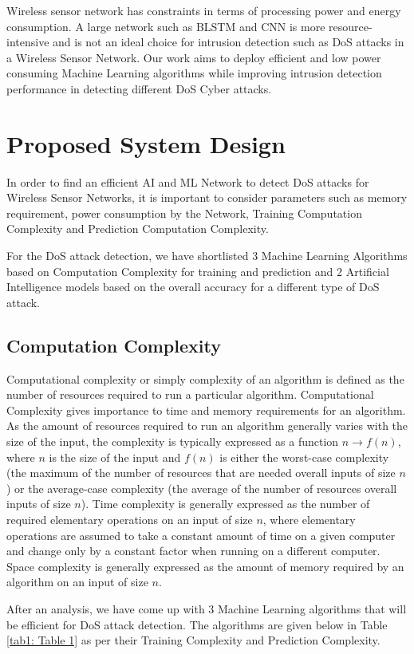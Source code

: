 \documentclass[conference]{IEEEtran}
\begin{document}
Wireless sensor network has constraints in terms of processing power and energy consumption. A large network such as BLSTM and CNN is more resource-intensive and is not an ideal choice for intrusion detection such as DoS attacks in a Wireless Sensor Network. Our work aims to deploy efficient and low power consuming Machine Learning algorithms while improving intrusion detection performance in detecting different DoS Cyber attacks.

\section{Proposed System Design}
In order to find an efficient AI and ML Network to detect DoS attacks for Wireless Sensor Networks, it is important to consider parameters such as memory requirement, power consumption by the Network, Training Computation Complexity and Prediction Computation Complexity. 

For the DoS attack detection, we have shortlisted 3 Machine Learning Algorithms based on Computation Complexity for training and prediction and 2 Artificial Intelligence models based on the overall accuracy for a different type of DoS attack. 

\subsection{Computation Complexity}
Computational complexity or simply complexity of an algorithm is defined as the number of resources required to run a particular algorithm. Computational Complexity gives importance to time and memory requirements for an algorithm. As the amount of resources required to run an algorithm generally varies with the size of the input, the complexity is typically expressed as a function $n \rightarrow{} f(n)$, where $n$ is the size of the input and $f(n)$ is either the worst-case complexity (the maximum of the number of resources that are needed overall inputs of size $n$) or the average-case complexity (the average of the number of resources overall inputs of size $n$). Time complexity is generally expressed as the number of required elementary operations on an input of size $n$, where elementary operations are assumed to take a constant amount of time on a given computer and change only by a constant factor when running on a different computer. Space complexity is generally expressed as the amount of memory required by an algorithm on an input of size $n$. 

After an analysis, we have come up with 3 Machine Learning algorithms that will be efficient for DoS attack detection. The algorithms are given below in Table \ref{tab1: Table 1} as per their Training Complexity and Prediction Complexity.
\end{document}
